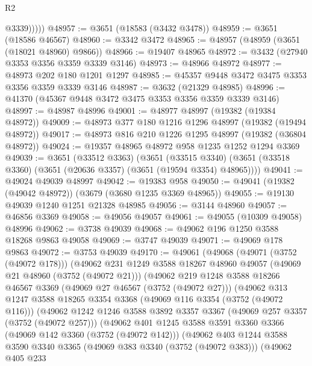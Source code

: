 \begin{lexlean}{R2}
\begin{coremodule}
              @3339)))))
@48957 := @3651 (@18583 (@3432 @3478))
@48959 := @3651 (@18586 @46567)
@48960 := @3342 @3472
@48965 := @48957 (@48959 (@3651 (@18021 @48960) @9866))
@48966 := @19407 @48965
@48972 := @3432 (@27940 @3353 @3356 @3359 @3339 @3146)
@48973 := @48966 @48972
@48977 := @48973 @202 @180 @1201 @1297
@48985 := @45357 @9448 @3472 @3475 @3353 @3356 @3359 @3339 @3146
@48987 := @3632 (@21329 @48985)
@48996 := @41370 (@45367 @9448 @3472 @3475 @3353 @3356 @3359 @3339 @3146)
@48997 := @48987 @48996
@49001 := @48977 @48997 (@19382 (@19384 @48972))
@49009 := @48973 @377 @180 @1216 @1296 @48997 (@19382 (@19494 @48972))
@49017 := @48973 @816 @210 @1226 @1295 @48997 (@19382 (@36804 @48972))
@49024 := @19357 @48965 @48972 @958 @1235 @1252 @1294 @3369
@49039 := @3651
    (@33512 @3363)
    (@3651
      (@33515 @3340)
      (@3651 (@33518 @3360) (@3651 (@20636 @3357) (@3651 (@19594 @3354) @48965))))
@49041 := @49024 @49039 @48997
@49042 := @19383 @958
@49050 := @49041 (@19382 (@49042 @48972)) (@3679 (@3680 @1235 @3369 @48965))
@49055 := @19130 @49039 @1240 @1251 @21328 @48985
@49056 := @3144 @48960
@49057 := @46856 @3369
@49058 := @49056 @49057
@49061 := @49055 (@10309 @49058) @48996
@49062 := @3738 @49039
@49068 := @49062 @196 @1250 @3588 @18268 @9863 @49058
@49069 := @3747 @49039
@49071 := @49069 @178 @9863
@49072 := @3753 @49039
@49170 := @49061
    (@49068
      (@49071 (@3752 (@49072 @178)))
      (@49062
        @231
        @1249
        @3588
        @18267
        @48960
        @49057
        (@49069 @21 @48960 (@3752 (@49072 @21)))
        (@49062
          @219
          @1248
          @3588
          @18266
          @46567
          @3369
          (@49069 @27 @46567 (@3752 (@49072 @27)))
          (@49062
            @313
            @1247
            @3588
            @18265
            @3354
            @3368
            (@49069 @116 @3354 (@3752 (@49072 @116)))
            (@49062
              @1242
              @1246
              @3588
              @3892
              @3357
              @3367
              (@49069 @257 @3357 (@3752 (@49072 @257)))
              (@49062
                @401
                @1245
                @3588
                @3591
                @3360
                @3366
                (@49069 @142 @3360 (@3752 (@49072 @142)))
                (@49062
                  @403
                  @1244
                  @3588
                  @3590
                  @3340
                  @3365
                  (@49069 @383 @3340 (@3752 (@49072 @383)))
                  (@49062
                    @405
                    @233

\end{coremodule}
\end{lexlean}
